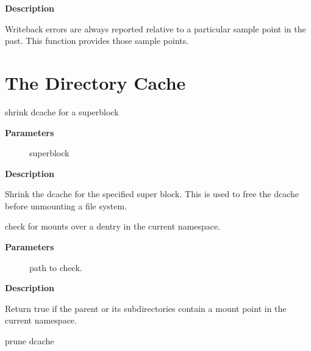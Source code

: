 \documentclass[a4paper,8pt,english]{sphinxmanual}
\begin{document}
\textbf{Description}

Writeback errors are always reported relative to a particular sample point
in the past. This function provides those sample points.


\section{The Directory Cache}
\label{filesystems/index:the-directory-cache}

\begin{fulllineitems}
\label{filesystems/index:c.shrink_dcache_sb}
shrink dcache for a superblock

\end{fulllineitems}


\textbf{Parameters}
\begin{description}
\item[{}] \leavevmode
superblock

\end{description}

\textbf{Description}

Shrink the dcache for the specified super block. This is used to free
the dcache before unmounting a file system.

\begin{fulllineitems}
\label{filesystems/index:c.path_has_submounts}
check for mounts over a dentry in the current namespace.

\end{fulllineitems}


\textbf{Parameters}
\begin{description}
\item[{}] \leavevmode
path to check.

\end{description}

\textbf{Description}

Return true if the parent or its subdirectories contain
a mount point in the current namespace.

\begin{fulllineitems}
\label{filesystems/index:c.shrink_dcache_parent}
prune dcache

\end{fulllineitems}
\end{document}
